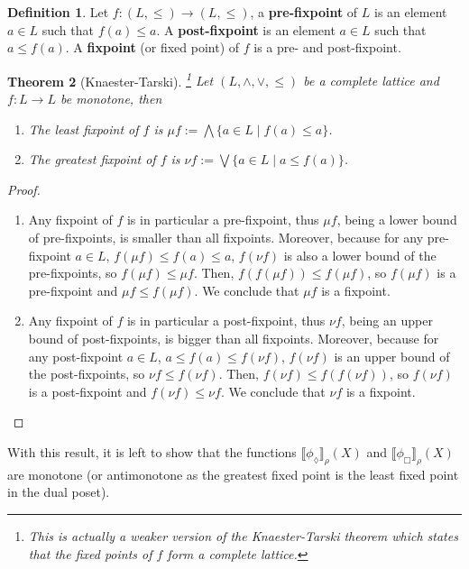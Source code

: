 \documentclass{tufte-handout} %
\newtheorem{thm}{Theorem}
\theoremstyle{definition}
\newtheorem{defn}[thm]{Definition}
\theoremstyle{remark}
\newcommand{\0}{\textsf{0}}
\newcommand{\1}{\textsf{1}}
\newcommand{\sem}[2]{\llbracket #1 \rrbracket_{#2}}
\begin{document}
\begin{defn}
	Let $f: (L, \leq) \rightarrow (L, \leq)$, a \textbf{pre-fixpoint} of $L$ is an element $a \in L$ such that $f(a) \leq a$. A \textbf{post-fixpoint} is an element $a \in L$ such that $a \leq f(a)$. A \textbf{fixpoint} (or fixed point) of $f$ is a pre- and post-fixpoint.
\end{defn}
\begin{thm}[Knaester-Tarski]\label{thm-knatar}\footnote{This is actually a weaker version of the Knaester-Tarski theorem which states that the fixed points of $f$ form a complete lattice.}
	Let $(L, \wedge, \vee, \leq)$ be a complete lattice and $f: L\rightarrow L$ be monotone, then 
	\begin{enumerate}
		\item The least fixpoint of $f$ is $\mu f := \bigwedge \{a \in L \mid f(a) \leq a\}$.
		\item The greatest fixpoint of $f$ is $\nu f := \bigvee\{a \in L \mid a \leq f(a)\}$.
	\end{enumerate}
\end{thm}
\begin{proof}
	\begin{enumerate}
		\item Any fixpoint of $f$ is in particular a pre-fixpoint, thus $\mu f$, being a lower bound of pre-fixpoints, is smaller than all fixpoints. Moreover, because for any pre-fixpoint $a\in L$, $f(\mu f) \leq f(a) \leq a$, $f(\nu f)$ is also a lower bound of the pre-fixpoints, so $f(\mu f) \leq \mu f$. Then, $f(f(\mu f)) \leq f(\mu f)$, so $f(\mu f)$ is a pre-fixpoint and $\mu f \leq f(\mu f)$. We conclude that $\mu f$ is a fixpoint.
		
		\item Any fixpoint of $f$ is in particular a post-fixpoint, thus $\nu f$, being an upper bound of post-fixpoints, is bigger than all fixpoints. Moreover, because for any post-fixpoint $a\in L$, $a \leq f(a) \leq f(\nu f)$, $f(\nu f)$ is an upper bound of the post-fixpoints, so $\nu f\leq f(\nu f)$. Then, $f(\nu f) \leq f(f(\nu f))$, so $f(\nu f)$ is a post-fixpoint and $f(\nu f) \leq \nu f$. We conclude that $\nu f$ is a fixpoint.
	\end{enumerate}
\end{proof}
With this result, it is left to show that the functions $\sem{\phi_{\lozenge}}{\rho}(X)$ and $\sem{\phi_{\Box}}{\rho}(X)$ are monotone (or antimonotone as the greatest fixed point is the least fixed point in the dual poset).
\end{document}
